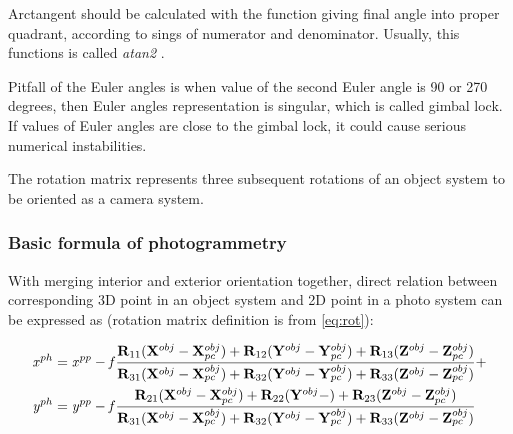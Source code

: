 \documentclass[a4paper,12pt]{article}
\newcommand{\ematr}[1]{%
{\bf #1}%
}
\newcommand{\evect}[1]{%
{\bf #1}%
}
\newcommand{\escal}[1]{%
{\it #1}%
}
\newcommand{\term}[1]{%
{\it #1}%
}
\begin{document}

Arctangent should be calculated with the function giving final angle into proper quadrant, according to sings of numerator 
and denominator. Usually, this functions is called \term{atan2}. 

Pitfall of the Euler angles is when value of the second Euler angle is 90 or 270 degrees,  
then Euler angles representation is singular, which is called gimbal lock. 
If values  of Euler angles are close to the gimbal lock, it could cause serious numerical instabilities.

The rotation matrix represents three subsequent rotations of an object system to be oriented as a camera system.

\subsubsection{Basic formula of photogrammetry}

With merging interior and exterior orientation together, direct relation between corresponding 3D point in an object system and 2D point
in a photo system can be expressed as (rotation matrix definition is from \eqref{eq:rot}):

\begin{equation}
\label{eq:col_eqs}
\begin{split}
&\escal{x}^{ph} = \escal{x}^{pp} -\escal{f}\frac{\ematr{R}_{11}(\evect{X}^{obj} - \evect{X}^{obj}_{pc}) + 
                                  \ematr{R}_{12}(\evect{Y}^{obj} - \evect{Y}^{obj}_{pc}) + 
                                  \ematr{R}_{13}(\evect{Z}^{obj} - \evect{Z}^{obj}_{pc})                                  
                                  }{
				  \ematr{R}_{31}(\evect{X}^{obj} - \evect{X}^{obj}_{pc}) + 
                                  \ematr{R}_{32}(\evect{Y}^{obj} - \evect{Y}^{obj}_{pc}) + 
                                  \ematr{R}_{33}(\evect{Z}^{obj} - \evect{Z}^{obj}_{pc})     
                                  } +  \\
&\escal{y}^{ph} = \escal{y}^{pp} -\escal{f}\frac{\ematr{R}_{21}(\evect{X}^{obj} - \evect{X}^{obj}_{pc}) + 
                                  \ematr{R}_{22}(\evect{Y}^{obj} - ) + 
                                  \ematr{R}_{23}(\evect{Z}^{obj} - \evect{Z}^{obj}_{pc})                                  
                                  }{
				  \ematr{R}_{31}(\evect{X}^{obj} - \evect{X}^{obj}_{pc}) + 
                                  \ematr{R}_{32}(\evect{Y}^{obj} - \evect{Y}^{obj}_{pc}) + 
                                  \ematr{R}_{33}(\evect{Z}^{obj} - \evect{Z}^{obj}_{pc})     
                                  }
\end{split}
\end{equation}
\end{document}
